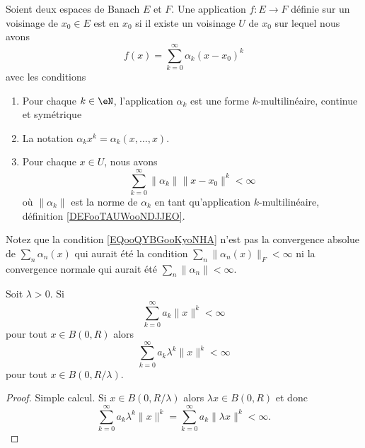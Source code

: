 \begin{definition}	\label{DEFooAIHMooKbWsBt}
	Soient deux espaces de Banach \( E\) et \( F\). Une application \(f \colon E\to F  \) définie sur un voisinage de \( x_0\in E\) est  en \( x_0\) si il existe un voisinage \( U\) de \( x_0\) sur lequel nous avons
	\begin{equation}		\label{EQooWATIooCCmlbT}
		f(x)=\sum_{k=0}^{\infty}\alpha_k(x-x_0)^k
	\end{equation}
	avec les conditions
	\begin{enumerate}
		\item
		      Pour chaque \( k\in \eN\), l'application \( \alpha_k\) est une forme \( k\)-multilinéaire, continue et symétrique
		\item
		      La notation \( \alpha_kx^k=\alpha_k(x,\ldots,x)\).
		\item
		      Pour chaque \( x\in U\), nous avons
		      \begin{equation}	\label{EQooQYBGooKyoNHA}
			      \sum_{k=0}^{\infty}\| \alpha_k \|\| x-x_0 \|^k<\infty
		      \end{equation}
		      où \( \| \alpha_k \|\) est la norme de \( \alpha_k\) en tant qu'application \( k\)-multilinéaire, définition \ref{DEFooTAUWooNDJJEO}.
	\end{enumerate}
\end{definition}

\begin{normaltext}
	Notez que la condition \eqref{EQooQYBGooKyoNHA} n'est pas la convergence absolue de \( \sum_n\alpha_n(x)\) qui aurait été la condition \( \sum_n\| \alpha_n(x) \|_F<\infty\) ni la convergence normale qui aurait été \( \sum_n\| \alpha_n \|<\infty\).
\end{normaltext}

\begin{lemma}	\label{LEMooWAUZooRHfGCl}
	Soit \( \lambda>0\). Si
	\begin{equation}
		\sum_{k=0}^{\infty}a_k\| x \|^k<\infty
	\end{equation}
	pour tout \( x\in B(0,R)\) alors
	\begin{equation}
		\sum_{k=0}^{\infty}a_k\lambda^k\| x \|^k<\infty
	\end{equation}
	pour tout \( x\in B(0,R/\lambda)\).
\end{lemma}

\begin{proof}
	Simple calcul. Si \( x\in B(0,R/\lambda)\) alors \( \lambda x\in B(0,R)\) et donc
	\begin{equation}
		\sum_{k=0}^{\infty}a_k\lambda^k\| x \|^k=\sum_{k=0}^{\infty}a_k\| \lambda x \|^k<\infty.
	\end{equation}
\end{proof}

